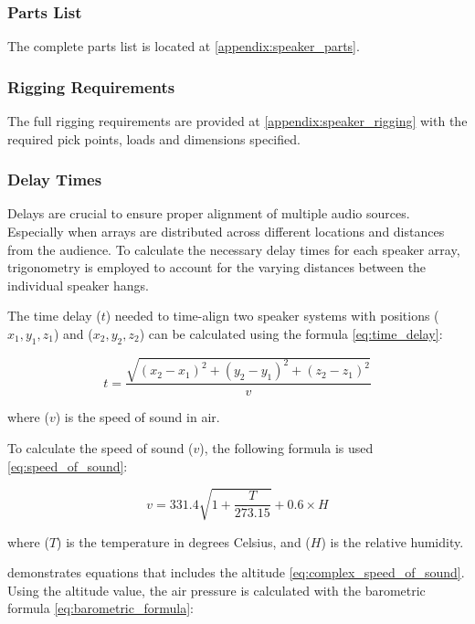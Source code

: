     \subsubsection{Parts List}
        The complete parts list is located at \ref{appendix:speaker_parts}.

    \subsubsection{Rigging Requirements}
        The full rigging requirements are provided at \ref{appendix:speaker_rigging} with the required pick points, loads and dimensions specified.

    \subsubsection{Delay Times}
        Delays are crucial to ensure proper alignment of multiple audio sources. Especially when arrays are distributed across different locations and distances from the audience. To calculate the necessary delay times for each speaker array, trigonometry is employed to account for the varying distances between the individual speaker hangs.

        The time delay ($t$) needed to time-align two speaker systems with positions ($x_1, y_1, z_1$) and ($x_2, y_2, z_2$) can be calculated using the formula \eqref{eq:time_delay}:

        \begin{equation}\label{eq:time_delay}
            t = \frac{\sqrt{(x_2 - x_1)^2 + (y_2 - y_1)^2 + (z_2 - z_1)^2}}{v}
        \end{equation}

        where ($v$) is the speed of sound in air.

        To calculate the speed of sound ($v$), the following formula is used \eqref{eq:speed_of_sound}:

        \begin{equation}\label{eq:speed_of_sound}
            v = 331.4 \sqrt{1 + \frac{T}{273.15}} + 0.6 \times H
        \end{equation}

        where ($T$) is the temperature in degrees Celsius, and ($H$) is the relative humidity.
        
        \citet{cramer1993} demonstrates equations that includes the altitude \eqref{eq:complex_speed_of_sound}. Using the altitude value, the air pressure is calculated with the barometric formula \eqref{eq:barometric_formula}:

